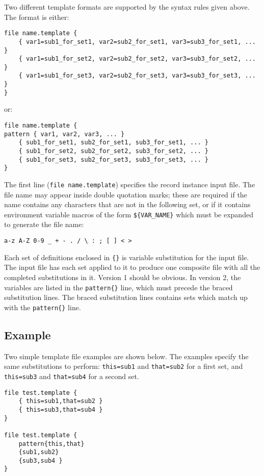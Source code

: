 Two different template formats are supported by the syntax rules given above.
The format is either:

\begin{lstlisting}[language=dbd]
file name.template {
    { var1=sub1_for_set1, var2=sub2_for_set1, var3=sub3_for_set1, ... }
    { var1=sub1_for_set2, var2=sub2_for_set2, var3=sub3_for_set2, ... }
    { var1=sub1_for_set3, var2=sub2_for_set3, var3=sub3_for_set3, ... }
}
\end{lstlisting}

or:

\begin{lstlisting}[language=dbd]
file name.template {
pattern { var1, var2, var3, ... }
    { sub1_for_set1, sub2_for_set1, sub3_for_set1, ... }
    { sub1_for_set2, sub2_for_set2, sub3_for_set2, ... }
    { sub1_for_set3, sub2_for_set3, sub3_for_set3, ... }
}
\end{lstlisting}

The first line (\verb|file name.template|) specifies the record instance input file. The file name may appear inside double
quotation marks; these are required if the name contains any characters that are not in the following set, or if it contains
environment variable macros of the form \verb|${VAR_NAME}| which must be expanded to generate the file name:

\begin{lstlisting}[language=dbd]
a-z A-Z 0-9 _ + - . / \ : ; [ ] < >
\end{lstlisting}

Each set of definitions enclosed in \verb|{}| is variable substitution for the input file. The input file has each set applied to it to
produce one composite file with all the completed substitutions in it. Version 1 should be obvious. In version 2, the
variables are listed in the \verb|pattern{}| line, which must precede the braced substitution lines. The braced substitution
lines contains sets which match up with the \verb|pattern{}| line.

\subsection{Example}

Two simple template file examples are shown below. The examples specify the same substitutions to perform: 
\verb|this=sub1| and \verb|that=sub2| for a first set, and \verb|this=sub3| and \verb|that=sub4| for a second set. 

\begin{lstlisting}[language=dbd]
file test.template {
    { this=sub1,that=sub2 }
    { this=sub3,that=sub4 }
}

file test.template {
    pattern{this,that}
    {sub1,sub2}
    {sub3,sub4 }
}
\end{lstlisting}

